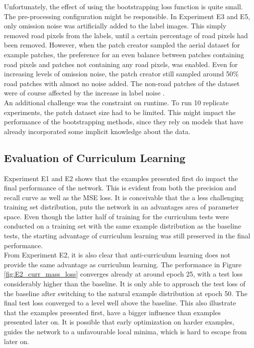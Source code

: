 Unfortunately, the effect of using the bootstrapping loss function is quite small. The pre-processing configuration might be responsible. In Experiment E3 and E5, only omission noise was artificially added to the label images. This simply removed road pixels from the labels, until a certain percentage of road pixels had been removed. However, when the patch creator sampled the aerial dataset for example patches, the preference for an even balance between patches containing road pixels and patches not containing any road pixels, was enabled. Even for increasing levels of omission noise, the patch creator still sampled around 50\% road patches with almost no noise added. The non-road patches of the dataset were of course affected by the increase in label noise .\\

An additional challenge was the constraint on runtime. To run 10 replicate experiments, the patch dataset size had to be limited. This might impact the performance of the bootstrapping methods, since they rely on models that have already incorporated some implicit knowledge about the data.\\

\subsection{Evaluation of Curriculum Learning}
Experiment E1 and E2 shows that the examples presented first do impact the final performance of the network. This is evident from both the precision and recall curve as well as the MSE loss. It is conceivable that the a less challenging training set distribution, puts the network in an advantages area of parameter space. Even though the latter half of training for the curriculum tests were conducted on  a training set with the same example distribution as the baseline tests, the starting advantage of curriculum learning was still preserved in the final performance.  \\

From Experiment E2, it is also clear that anti-curriculum learning does not provide the same advantage as curriculum learning. The performance in Figure \ref{fig:E2_curr_mass_loss} converges already at around epoch 25, with a test loss considerably higher than the baseline. It is only able to approach the test loss of the baseline after switching to the natural example distribution at epoch 50. The final test loss converged to a level well above the baseline. This also illustrate that the examples presented first, have a bigger influence than examples presented later on. It is possible that early optimization on harder examples, guides the network to a unfavourable local minima, which is hard to escape from later on.\\

